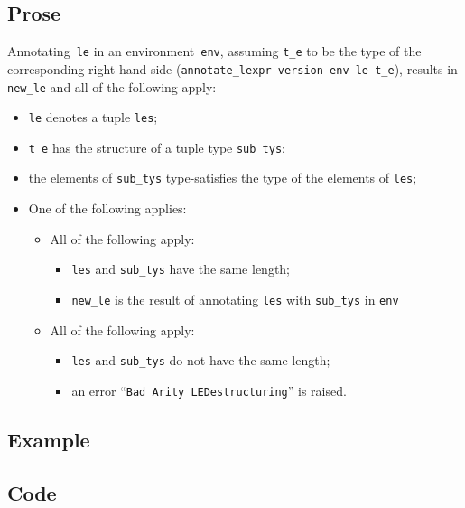 \documentclass{book}
\begin{document}
  \subsection{Prose}
   Annotating~\texttt{le} in an environment~\texttt{env}, assuming
\texttt{t\_e} to be the type of the corresponding right-hand-side
(\texttt{annotate\_lexpr version env le t\_e}), results in \texttt{new\_le} and
all of the following apply:
   \begin{itemize}
   \item \texttt{le} denotes a tuple \texttt{les};
   \item \texttt{t\_e} has the structure of a tuple type \texttt{sub\_tys};
   \item the elements of \texttt{sub\_tys} type-satisfies the type of the elements of \texttt{les};
   \item One of the following applies:
     \begin{itemize}
     \item All of the following apply:
       \begin{itemize}
       \item \texttt{les} and \texttt{sub\_tys} have the same length;
       \item \texttt{new\_le} is the result of annotating \texttt{les} with \texttt{sub\_tys} in \texttt{env}
       \end{itemize}
     \item All of the following apply:
       \begin{itemize}
       \item \texttt{les} and \texttt{sub\_tys} do not have the same length;
       \item an error ``\texttt{Bad Arity LEDestructuring}'' is raised.
       \end{itemize}
     \end{itemize}
   \end{itemize}

  \subsection{Example}

  \subsection{Code}
\end{document}
